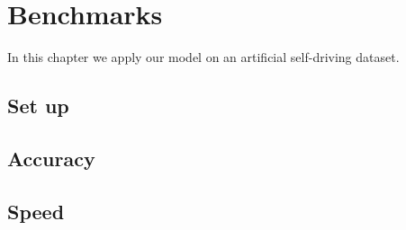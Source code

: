 
\chapter{Benchmarks}\label{chp:benchmarks}

In this chapter we apply our model on an artificial self-driving dataset.

\section{Set up}

\section{Accuracy}

\section{Speed}
